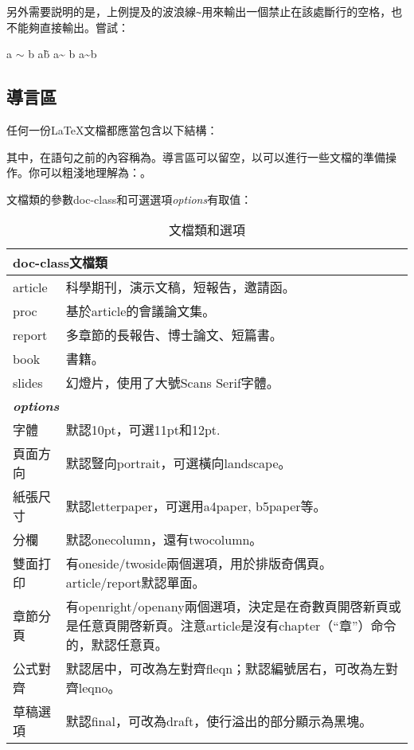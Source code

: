 另外需要説明的是，上例提及的波浪線{\texttt{\~}}用來輸出一個禁止在該處斷行的空格，也不能夠直接輸出。嘗試：
\begin{codeshow}
a $\sim$ b
a\~ b
a\~{} b
a\textasciitilde b
\end{codeshow}

\subsection{導言區}
任何一份\LaTeX{}文檔都應當包含以下結構：

其中，在語句之前的內容稱為。導言區可以留空，以可以進行一些文檔的準備操作。你可以粗淺地理解為：。\dpar

文檔類的參數doc-class和可選選項{\textit{options}}有取值：
\begin{table}[!htb]
    \centering
	\caption{文檔類和選項}
	\label{tab:documentclass}
	\begin{tabular}{p{5em} @{\ -\ } p{24em}}
		\hline
		 \\
		\hline
		article   & 科學期刊，演示文稿，短報告，邀請函。\\
		proc      & 基於article的會議論文集。\\
		report    & 多章節的長報告、博士論文、短篇書。\\
		book      & 書籍。\\
		slides    & 幻燈片，使用了大號Scans Serif字體。\\
		\hline
		 \\
		\hline
		字體     & 默認10pt，可選11pt和12pt.\\
		頁面方向 & 默認豎向portrait，可選橫向landscape。\\
		紙張尺寸 & 默認letterpaper，可選用a4paper, b5paper等。\\
		分欄     & 默認onecolumn，還有twocolumn。\\
		雙面打印 & 有oneside/twoside兩個選項，用於排版奇偶頁。article/report默認單面。\\
		章節分頁 & 有openright/openany兩個選項，決定是在奇數頁開啓新頁或是任意頁開啓新頁。注意article是沒有chapter（``章''）命令的，默認任意頁。\\
		公式對齊 & 默認居中，可改為左對齊fleqn；默認編號居右，可改為左對齊leqno。\\
		草稿選項 & 默認final，可改為draft，使行溢出的部分顯示為黑塊。\\
		\hline
	\end{tabular}
\end{table}

